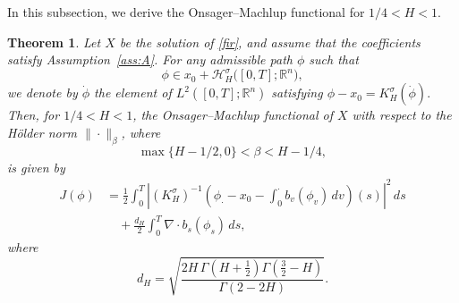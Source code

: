 \documentclass[preprint,12pt]{elsarticle}
\newtheorem{theorem}{Theorem}[section]
\theoremstyle{definition}
\theoremstyle{plain}
\begin{document}
In this subsection, we derive the Onsager--Machlup functional for
\(1/4<H<1\).

\begin{theorem}
\label{thm:OM-n-dimensional}
Let \(X\) be the solution of \eqref{fir}, and assume that the coefficients
satisfy Assumption~\ref{ass:A}. For any admissible path \(\phi\) such that
\[
    \phi\in x_0+\mathcal H_H^\sigma\bigl([0,T];\mathbb R^n\bigr),
\]
we denote by \(\dot\phi\) the element of \(L^2([0,T];\mathbb R^n)\) satisfying $
    \phi-x_0=K_H^\sigma(\dot\phi).
$
Then, for \(1/4<H<1\), the Onsager--Machlup functional of \(X\) with respect
to the H\"older norm \(\|\cdot\|_\beta\), where
\[
    \max\{H-1/2,0\}<\beta<H-1/4,
\]
is given by
\begin{equation}
\label{eq:OM-functional-n-dimensional}
\begin{aligned}
J(\phi)
&=
\frac12\int_0^T
\left|
(K_H^\sigma)^{-1}
\left(
    \phi_\cdot-x_0-\int_0^\cdot b_v(\phi_v)\,dv
\right)(s)
\right|^2\,ds  \\
&\quad
+\frac{d_H}{2}\int_0^T \nabla\cdot b_s(\phi_s)\,ds ,
\end{aligned}
\end{equation}
where
\[
    d_H
    =
    \sqrt{
    \frac{
    2H\,\Gamma\!\left(H+\frac12\right)
    \Gamma\!\left(\frac32-H\right)
    }{
    \Gamma(2-2H)
    }} .
\]
\end{theorem}
\end{document}
